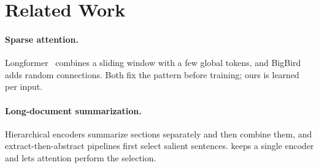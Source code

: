 \section{Related Work}
\label{sec:related}

\paragraph{Sparse attention.} Longformer~\citep{beltagy2020longformer} combines a sliding window with a few global tokens, and BigBird~\citep{zaheer2020bigbird} adds random connections. Both fix the pattern before training; ours is learned per input.

\paragraph{Long-document summarization.} Hierarchical encoders summarize sections separately and then combine them, and extract-then-abstract pipelines first select salient sentences. \model{} keeps a single encoder and lets attention perform the selection.
